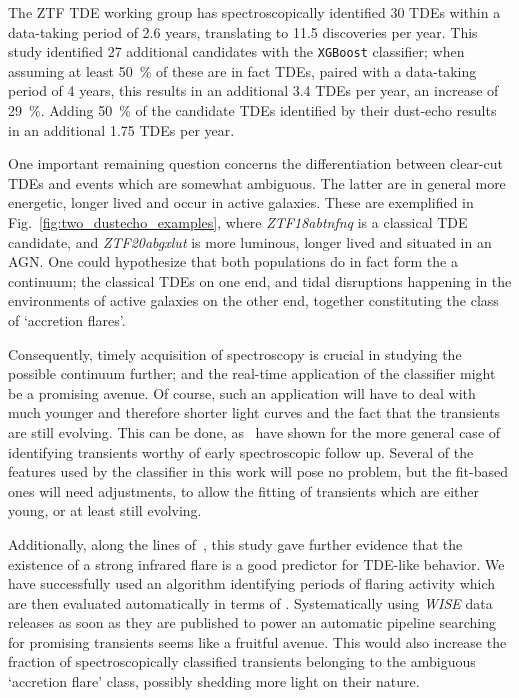 The ZTF TDE working group has spectroscopically identified 30 TDEs within a data-taking period of 2.6 years, translating to 11.5 discoveries per year. This study identified 27 additional candidates with the \texttt{XGBoost} classifier; when assuming at least \SI{50}{\percent} of these are in fact TDEs, paired with a data-taking period of 4 years, this results in an additional 3.4 TDEs per year, an increase of \SI{29}{\percent}. Adding \SI{50}{\percent} of the candidate TDEs identified by their dust-echo results in an additional 1.75 TDEs per year.

One important remaining question concerns the differentiation between clear-cut TDEs and events which are somewhat ambiguous. The latter are in general more energetic, longer lived and occur in active galaxies. These are exemplified in Fig.~\ref{fig:two_dustecho_examples}, where \textit{ZTF18abtnfnq} is a classical TDE candidate, and \textit{ZTF20abgxlut} is more luminous, longer lived and situated in an AGN. One could hypothesize that both populations do in fact form the a continuum; the classical TDEs on one end, and tidal disruptions happening in the environments of active galaxies on the other end, together constituting the class of `accretion flares'.

Consequently, timely acquisition of spectroscopy is crucial in studying the possible continuum further; and the real-time application of the classifier might be a promising avenue. Of course, such an application will have to deal with much younger and therefore shorter light curves and the fact that the transients are still evolving. This can be done, as~ have shown for the more general case of identifying transients worthy of early spectroscopic follow up. Several of the features used by the classifier in this work will pose no problem, but the fit-based ones will need adjustments, to allow the fitting of transients which are either young, or at least still evolving.

Additionally, along the lines of~\cite{Velzen2021}, this study gave further evidence that the existence of a strong infrared flare is a good predictor for TDE-like behavior. We have successfully used an algorithm identifying periods of flaring activity which are then evaluated automatically in terms of . Systematically using \textit{WISE} data releases as soon as they are published to power an automatic pipeline searching for promising transients seems like a fruitful avenue. This would also increase the fraction of spectroscopically classified transients belonging to the ambiguous `accretion flare' class, possibly shedding more light on their nature.

